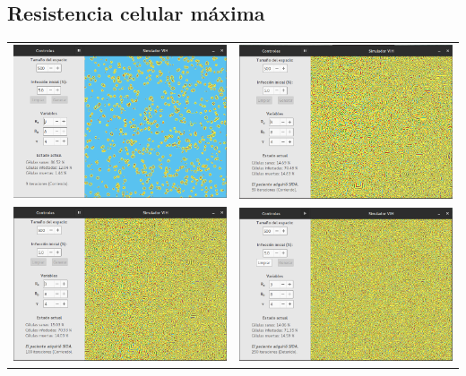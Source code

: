 \documentclass[12pt,letterpaper,oneside]{report}
\begin{document}
	\subsection{Resistencia celular máxima} %
	\label{sub:resistencia_celular_m_xima}
	\begin{center}
		\begin{tabular}{c c}
		\includegraphics[width=8cm]{img/resistencia/max/1.png} & \includegraphics[width=8cm]{img/resistencia/max/2.png} \\
		\includegraphics[width=8cm]{img/resistencia/max/3.png} & \includegraphics[width=8cm]{img/resistencia/max/4.png} \\
		\end{tabular}
	\end{center}
\end{document}
